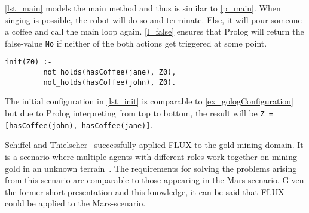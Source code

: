 \autoref{lst_main} models the main method and thus is similar to \autoref{p_main}. When singing is possible, the robot will do so and terminate. Else, it will pour someone a coffee and call the main loop again. \autoref{l_false} ensures that Prolog will return the false-value \texttt{No} if neither of the both actions get triggered at some point.
\begin{lstlisting}[firstnumber=17, caption={Initial configuration.}, label=lst_init]
  init(Z0) :-
         not_holds(hasCoffee(jane), Z0),
         not_holds(hasCoffee(john), Z0).
\end{lstlisting}
The initial configuration in \autoref{lst_init} is comparable to \autoref{ex_gologConfiguration} but due to Prolog interpreting from top to bottom, the result will be \texttt{Z = [hasCoffee(john), hasCoffee(jane)]}.

Schiffel and Thielscher~\cite{schiffel_multi-agent_2007} successfully applied FLUX to the gold mining domain. It is a scenario where multiple agents with different roles work together on mining gold in an unknown terrain~\cite{schiffel_multi-agent_2007}. The requirements for solving the problems arising from this scenario are comparable to those appearing in the Mars-scenario. Given the former short presentation and this knowledge, it can be said that FLUX could be applied to the Mars-scenario.
